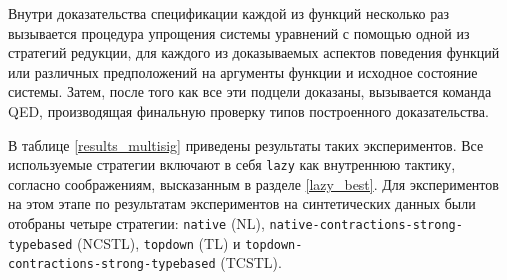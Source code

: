 \documentclass[../thesis.tex]{subfiles}
\begin{document}
Внутри доказательства спецификации каждой из функций несколько раз вызывается процедура упрощения системы уравнений с помощью одной из стратегий редукции, для каждого из доказываемых аспектов поведения функций или различных предположений на аргументы функции и исходное состояние системы. Затем, после того как все эти подцели доказаны, вызывается команда QED, производящая финальную проверку типов построенного доказательства.

В таблице \ref{results_multisig} приведены результаты таких экспериментов. Все используемые стратегии включают в себя \texttt{lazy} как внутреннюю тактику, согласно соображениям, высказанным в разделе \ref{lazy_best}. Для экспериментов на этом этапе по результатам экспериментов на синтетических данных были отобраны четыре стратегии: \texttt{native} (NL), \texttt{native-contractions-strong-typebased} (NCSTL), \texttt{topdown} (TL) и \texttt{topdown-}\\\texttt{contractions-strong-typebased} (TCSTL).
\end{document}

